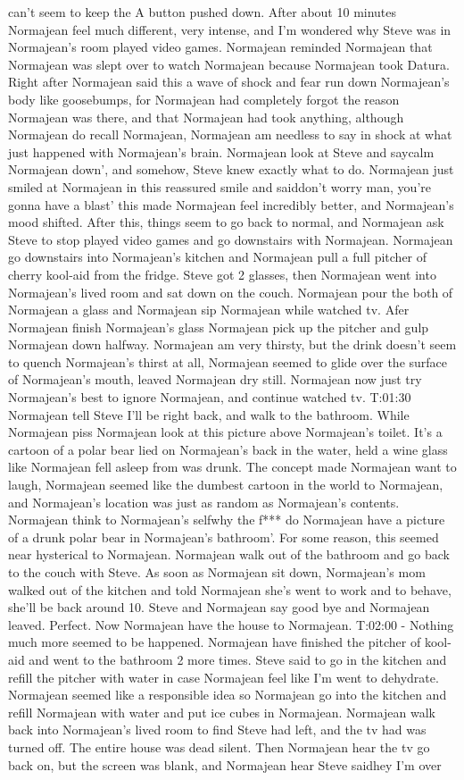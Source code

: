 \documentclass[12pt]{book}
\begin{document}
can't seem to keep the A button pushed down. After about 10 minutes Normajean feel much different, very intense, and I'm wondered why Steve was in Normajean's room played video games. Normajean reminded Normajean that Normajean was slept over to watch Normajean because Normajean took Datura. Right after Normajean said this a wave of shock and fear run down Normajean's body like goosebumps, for Normajean had completely forgot the reason Normajean was there, and that Normajean had took anything, although Normajean do recall Normajean, Normajean am needless to say in shock at what just happened with Normajean's brain. Normajean look at Steve and saycalm Normajean down', and somehow, Steve knew exactly what to do. Normajean just smiled at Normajean in this reassured smile and saiddon't worry man, you're gonna have a blast' this made Normajean feel incredibly better, and Normajean's mood shifted. After this, things seem to go back to normal, and Normajean ask Steve to stop played video games and go downstairs with Normajean. Normajean go downstairs into Normajean's kitchen and Normajean pull a full pitcher of cherry kool-aid from the fridge. Steve got 2 glasses, then Normajean went into Normajean's lived room and sat down on the couch. Normajean pour the both of Normajean a glass and Normajean sip Normajean while watched tv. Afer Normajean finish Normajean's glass Normajean pick up the pitcher and gulp Normajean down halfway. Normajean am very thirsty, but the drink doesn't seem to quench Normajean's thirst at all, Normajean seemed to glide over the surface of Normajean's mouth, leaved Normajean dry still. Normajean now just try Normajean's best to ignore Normajean, and continue watched tv. T:01:30 Normajean tell Steve I'll be right back, and walk to the bathroom. While Normajean piss Normajean look at this picture above Normajean's toilet. It's a cartoon of a polar bear lied on Normajean's back in the water, held a wine glass like Normajean fell asleep from was drunk. The concept made Normajean want to laugh, Normajean seemed like the dumbest cartoon in the world to Normajean, and Normajean's location was just as random as Normajean's contents. Normajean think to Normajean's selfwhy the f*** do Normajean have a picture of a drunk polar bear in Normajean's bathroom'. For some reason, this seemed near hysterical to Normajean. Normajean walk out of the bathroom and go back to the couch with Steve. As soon as Normajean sit down, Normajean's mom walked out of the kitchen and told Normajean she's went to work and to behave, she'll be back around 10. Steve and Normajean say good bye and Normajean leaved. Perfect. Now Normajean have the house to Normajean. T:02:00 - Nothing much more seemed to be happened. Normajean have finished the pitcher of kool-aid and went to the bathroom 2 more times. Steve said to go in the kitchen and refill the pitcher with water in case Normajean feel like I'm went to dehydrate. Normajean seemed like a responsible idea so Normajean go into the kitchen and refill Normajean with water and put ice cubes in Normajean. Normajean walk back into Normajean's lived room to find Steve had left, and the tv had was turned off. The entire house was dead silent. Then Normajean hear the tv go back on, but the screen was blank, and Normajean hear Steve saidhey I'm over 
\end{document}
